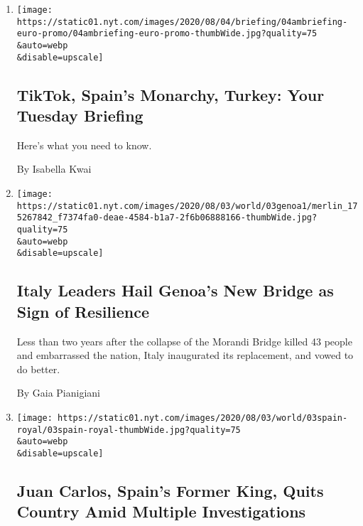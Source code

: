 \begin{enumerate}
\def\labelenumi{\arabic{enumi}.}
\item
  \href{/2020/08/03/briefing/tiktok-spain-turkey.html}{}

  \texttt{[image: https://static01.nyt.com/images/2020/08/04/briefing/04ambriefing-euro-promo/04ambriefing-euro-promo-thumbWide.jpg?quality=75\\\&auto=webp\\\&disable=upscale]}

  \hypertarget{tiktok-spains-monarchy-turkey-your-tuesday-briefing}{%
  \subsection{TikTok, Spain's Monarchy, Turkey: Your Tuesday
  Briefing}\label{tiktok-spains-monarchy-turkey-your-tuesday-briefing}}

  Here's what you need to know.

  By Isabella Kwai
\item
  \href{/2020/08/03/world/europe/genoa-italy-new-bridge.html}{}

  \texttt{[image: https://static01.nyt.com/images/2020/08/03/world/03genoa1/merlin\_175267842\_f7374fa0-deae-4584-b1a7-2f6b06888166-thumbWide.jpg?quality=75\\\&auto=webp\\\&disable=upscale]}

  \hypertarget{italy-leaders-hail-genoas-new-bridge-as-sign-of-resilience}{%
  \subsection{Italy Leaders Hail Genoa's New Bridge as Sign of
  Resilience}\label{italy-leaders-hail-genoas-new-bridge-as-sign-of-resilience}}

  Less than two years after the collapse of the Morandi Bridge killed 43
  people and embarrassed the nation, Italy inaugurated its replacement,
  and vowed to do better.

  By Gaia Pianigiani
\item
  \href{/2020/08/03/world/europe/juan-carlos-leaves-spain.html}{}

  \texttt{[image: https://static01.nyt.com/images/2020/08/03/world/03spain-royal/03spain-royal-thumbWide.jpg?quality=75\\\&auto=webp\\\&disable=upscale]}

  \hypertarget{juan-carlos-spains-former-king-quits-country-amid-multiple-investigations}{%
  \subsection{Juan Carlos, Spain's Former King, Quits Country Amid
  Multiple
  Investigations}\label{juan-carlos-spains-former-king-quits-country-amid-multiple-investigations}}


\end{enumerate}
